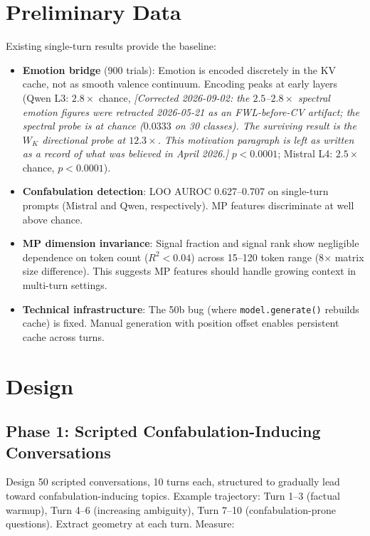 \documentclass[11pt,letterpaper]{article}
\begin{document}
\section{Preliminary Data}

Existing single-turn results provide the baseline:

\begin{itemize}
  \item \textbf{Emotion bridge} (900 trials): Emotion is encoded
    discretely in the KV cache, not as smooth valence continuum.
    Encoding peaks at early layers (Qwen L3: $2.8\times$ chance,
\emph{[Corrected 2026-09-02: the $2.5$--$2.8\times$ spectral emotion figures were retracted 2026-05-21 as an FWL-before-CV artifact; the spectral probe is at chance ($0.0333$ on 30 classes). The surviving result is the $W_K$ directional probe at $12.3\times$. This motivation paragraph is left as written as a record of what was believed in April 2026.]}
    $p < 0.0001$; Mistral L4: $2.5\times$ chance, $p < 0.0001$).

  \item \textbf{Confabulation detection}: LOO AUROC 0.627--0.707 on
    single-turn prompts (Mistral and Qwen, respectively). MP features
    discriminate at well above chance.

  \item \textbf{MP dimension invariance}: Signal fraction and signal
    rank show negligible dependence on token count ($R^2 < 0.04$)
    across 15--120 token range (8$\times$ matrix size difference).
    This suggests MP features should handle growing context in
    multi-turn settings.

  \item \textbf{Technical infrastructure}: The 50b bug (where
    \texttt{model.generate()} rebuilds cache) is fixed. Manual
    generation with position offset enables persistent cache across
    turns.
\end{itemize}

\section{Design}

\subsection{Phase 1: Scripted Confabulation-Inducing Conversations}

Design 50 scripted conversations, 10 turns each, structured to
gradually lead toward confabulation-inducing topics. Example
trajectory: Turn 1--3 (factual warmup), Turn 4--6 (increasing
ambiguity), Turn 7--10 (confabulation-prone questions). Extract
geometry at each turn. Measure:
\end{document}
